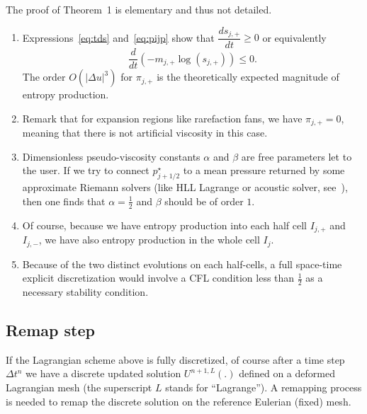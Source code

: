 \documentclass[graybox]{svmult}
\newcommand{\ps}{p_{j+1/2}^\star}
\newcommand{\mjp}{m_{j,+}}
\begin{document}
%
The proof of Theorem~1 is elementary and thus not detailed.
%
\begin{remark}
\begin{enumerate}[label=\alph*)]
\item Expressions~\eqref{eq:tds} and~\eqref{eq:pijp} show that $\dfrac{d s_{j,+}}{dt} \geq 0$
or equivalently
%
\begin{equation}
\frac{d}{dt} (-\mjp\log(s_{j,+})) \leq 0.
\label{eq:djlag}
\end{equation}
%
The order $O(|\Delta u|^3)$ for $\pi_{j,+}$ is the theoretically expected magnitude of entropy production. 
%
\item Remark that for expansion regions like rarefaction fans, we have $\pi_{j,+}=0$,
meaning that there is not artificial viscosity in this case.
%
\item Dimensionless pseudo-viscosity constants $\alpha$ and $\beta$ are free parameters
let to the user. If we try to connect $\ps$ to a mean pressure returned by some approximate Riemann solvers (like HLL Lagrange or acoustic solver, see~\cite{Toro09}), then one finds that 
$\alpha=\frac{1}{2}$ and $\beta$ should be of order $1$.
%
\item Of course, because we have entropy production into each half cell $I_{j,+}$
and $I_{j,-}$, we have also entropy production in the whole cell $I_j$.
%
\item Because of the two distinct evolutions on each half-cells, a full space-time explicit discretization would involve a CFL condition less than $\frac{1}{2}$ as a necessary
stability condition.
\end{enumerate}
\end{remark}
%
\vspace{-0.5cm}
\subsection{Remap step}
%
If the Lagrangian scheme above is fully discretized, of course after a time step $\Delta t^n$
we have a discrete updated solution $U^{n+1,L}(.)$ defined on a deformed Lagrangian mesh
(the superscript $L$ stands for ``Lagrange''). 
A remapping process is needed to remap the discrete solution on the reference Eulerian (fixed) mesh.
\end{document}
